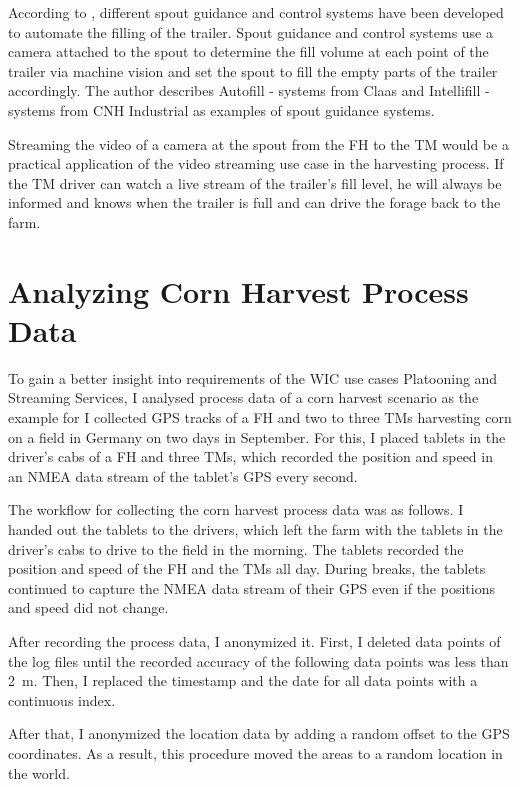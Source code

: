 According to \textcite{murcia_quadrotor_2014}, different spout guidance and control systems have been developed to automate the filling of the trailer. Spout guidance and control systems use a camera attached to the spout to determine the fill volume at each point of the trailer via machine vision and set the spout to fill the empty parts of the trailer accordingly. The author describes Autofill - systems from Claas and Intellifill - systems from CNH Industrial as examples of spout guidance systems. 

Streaming the video of a camera at the spout from the \ac{FH} to the \ac{TM} would be a practical application of the video streaming use case in the harvesting process. If the \ac{TM} driver can watch a live stream of the trailer's fill level, he will always be
informed and knows when the trailer is full and can drive the forage back to the
farm.

\chapter{Analyzing Corn Harvest Process Data}

To gain a better insight into requirements of the \ac{WIC} use cases Platooning and Streaming Services, I analysed process data of a corn harvest scenario as the example for I collected GPS tracks of  a  \ac{FH} and two to three \ac{TM}s harvesting corn on a field in Germany on two days in September. For this, I placed tablets in the driver's cabs of  a  \ac{FH} and three \ac{TM}s, which recorded the position and speed in an NMEA data stream of the tablet's GPS every second. 

The workflow for collecting the corn harvest process data was as follows. 
I handed out the tablets to the drivers, which left the farm with the tablets in the driver's cabs to drive to the field in the morning. The tablets recorded the position and speed of the \ac{FH} and the \ac{TM}s all day. During breaks, the tablets continued to capture the NMEA data stream of their GPS even if the positions and speed did not change.

After recording the process data, I anonymized it. 
First, I deleted data points of the log files until the recorded accuracy of the following data points was less than \SI{2}{\metre}. Then, I replaced the timestamp and the date for all data points with a continuous index.

After that, I anonymized the location data by adding a random offset to the GPS coordinates. As a result, this procedure moved the areas to a random location in the world.

